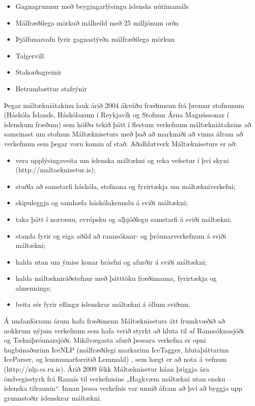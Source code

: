 \begin{multicols}{2}
\begin{itemize}
\item Gagnagrunnur með beygingarlýsingu íslensks nútímamáls
\item Málfræðilega mörkuð málheild með 25 milljónum orða 
\item Þjálfunarsafn fyrir gagnastýrða málfræðilega mörkun
\item Talgervill
\item Stakorðagreinir 
\item Betrumbættur stafrýnir
\end{itemize}

Þegar máltækniátakinu lauk árið 2004 ákváðu fræðimenn frá þremur stofnunum (Háskóla Íslands, Háskólanum í Reykjavík og Stofnun Árna Magnússonar í íslenskum fræðum) sem höfðu tekið þátt í flestum verkefnum máltækniátaksins að sameinast um stofnun Máltækniseturs með það að markmiði að vinna áfram að verkefnum sem þegar voru komin af stað. Aðalhlutverk Máltækniseturs er að:

\begin{itemize}
\item vera upplýsingaveita um íslenska máltækni og reka vefsetur í því skyni (http://maltaeknisetur.is); 
\item stuðla að samstarfi háskóla, stofnana og fyrirtækja um máltækniverkefni;
\item skipuleggja og samhæfa háskólakennslu á sviði máltækni;
\item taka þátt í norrænu, evrópsku og alþjóðlegu samstarfi á sviði máltækni;
\item standa fyrir og eiga aðild að rannsóknar- og þróunarverkefnum á sviði máltækni;
\item halda utan um ýmiss konar hráefni og afurðir á sviði máltækni;
\item halda máltækniráðstefnur með þátttöku fræði\-manna, fyrirtækja og almennings;
\item beita sér fyrir eflingu íslenskrar máltækni á öllum sviðum.
\end{itemize}

Á undanförnum árum hafa fræðimenn Máltækniseturs átt frumkvæðið að nokkrum nýjum verkefnum sem hafa verið styrkt að hluta til af Rannsóknasjóði og Tækniþróunarsjóði. Mikilvægasta afurð þessara verkefna er opni hugbúnaðurinn IceNLP (málfræðilegi markarinn IceTagger, hlutaþáttarinn IceParser, og lemmunarforritið Lemmald) \cite{icenlp1}, sem hægt er að nota á vefnum (http://nlp.cs.ru.is). Árið 2009 fékk Máltæknisetur háan þriggja ára öndvegisstyrk frá Rannís til verkefnisins „Hagkvæm máltækni utan ensku -- íslenska tilraunin“. Innan þessa verkefnis var unnið áfram að því að byggja upp grunnstoðir íslenskrar máltækni.


\end{multicols}
